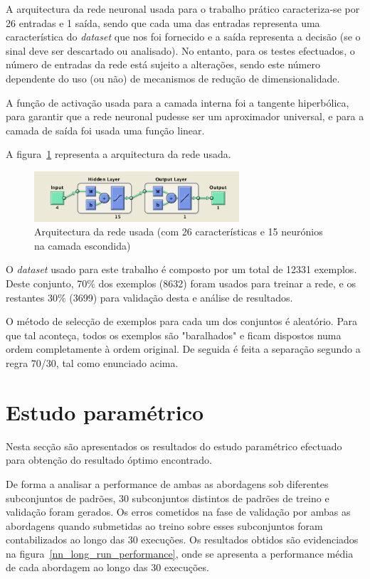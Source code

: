 \documentclass{article}
\begin{document}
A arquitectura da rede neuronal usada para o trabalho prático caracteriza-se por 26 entradas e 1 saída, sendo que cada uma das entradas representa uma característica do \textit{dataset} que nos foi fornecido e a saída representa a decisão (se o sinal deve ser descartado ou analisado). No entanto, para os testes efectuados, o número de entradas da rede está sujeito a alterações, sendo este número dependente do uso (ou não) de mecanismos de redução de dimensionalidade.

A função de activação usada para a camada interna foi a tangente hiperbólica, para garantir que a rede neuronal pudesse ser um aproximador universal, e para a camada de saída foi usada uma função linear.

A figura~\ref{nn_architecture} representa a arquitectura da rede usada.

\begin{figure}[!h]
  \centering
  \includegraphics[width=3in]{figures/nn_architecture}
  \caption{Arquitectura da rede usada (com 26 características e 15 neurónios na camada escondida)}
  \label{nn_architecture}
\end{figure}

O \textit{dataset} usado para este trabalho é composto por um total de 12331 exemplos. Deste conjunto, 70\% dos exemplos (8632) foram usados para treinar a rede, e os restantes 30\% (3699) para validação desta e análise de resultados.

O método de selecção de exemplos para cada um dos conjuntos é aleatório. Para que tal aconteça, todos os exemplos são "baralhados" e ficam dispostos numa ordem completamente à ordem original. De seguida é feita a separação segundo a regra 70/30, tal como enunciado acima.

\clearpage
\section{Estudo paramétrico}
\indent \indent Nesta secção são apresentados os resultados do estudo paramétrico efectuado para obtenção do resultado óptimo encontrado.

De forma a analisar a performance de ambas as abordagens sob diferentes subconjuntos de padrões, 30 subconjuntos distintos de padrões de treino e validação foram gerados. Os erros cometidos na fase de validação por ambas as abordagens quando submetidas ao treino sobre esses subconjuntos foram contabilizados ao longo das 30 execuções. Os resultados obtidos são evidenciados na figura~\ref{nn_long_run_performance}, onde se apresenta a performance média de cada abordagem ao longo das 30 execuções.
\end{document}
